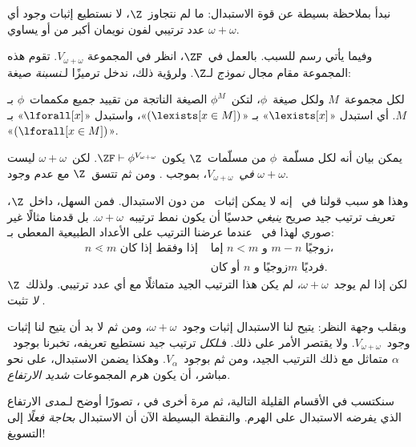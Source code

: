 \documentclass[../../../include/open-logic-section]{subfiles}
\begin{document}

نبدأ بملاحظة بسيطة عن قوة الاستبدال: ما لم نتجاوز~$\Z$، لا نستطيع
إثبات وجود أي عدد ترتيبي لفون نويمان أكبر من أو يساوي
$\omega + \omega$.

وفيما يأتي رسم للسبب. بالعمل في~$\ZF$، انظر في المجموعة
$V_{\omega+\omega}$. تقوم هذه المجموعة مقام مجال \emph{نموذج} لـ$\Z$.
ولرؤية ذلك، ندخل ترميزًا لـ\emph{نسبنة} صيغة:
\begin{defn}
	لكل مجموعة~$M$ ولكل صيغة~$\phi$، لتكن~$\phi^M$ الصيغة الناتجة من
	تقييد جميع مكممات~$\phi$ بـ$M$. أي استبدل «$\lexists[x]$» بـ
	«$(\lexists[x \in M])$»، واستبدل «$\lforall[x]$» بـ
	«$(\lforall[x \in M])$».
\end{defn}\noindent
يمكن بيان أنه لكل مسلّمة~$\phi$ من مسلّمات~$\Z$ يكون
$\ZF \vdash \phi^{V_{\omega+\omega}}$. لكن~$\omega+\omega$ ليست
\emph{في}~$V_{\omega+\omega}$، بموجب
. ومن ثم تتسق~$\Z$ مع عدم وجود
$\omega+\omega$.

وهذا هو سبب قولنا في~ إنه لا يمكن
إثبات~ من دون
الاستبدال. فمن السهل، داخل~$\Z$، تعريف ترتيب جيد صريح \emph{ينبغي}
حدسيًا أن يكون نمط ترتيبه~$\omega+\omega$. بل قدمنا مثالًا غير صوري
لهذا في~ عندما عرضنا الترتيب على الأعداد
الطبيعية المعطى بـ:
\begin{align*}
	n \lessdot m \text{ إذا وفقط إذا كان }&
	\text{إما }n < m\text{ و }m-n\text{ زوجيًا،}\\
	& \text{أو كان $n$ زوجيًا و$m$ فرديًا.}
\end{align*}
لكن إذا لم يوجد~$\omega+\omega$، لم يكن هذا الترتيب الجيد متماثلًا مع
أي عدد ترتيبي. ولذلك~$\Z$ \emph{لا} تثبت
.

وبقلب وجهة النظر: يتيح لنا الاستبدال إثبات وجود~$\omega+\omega$،
ومن ثم لا بد أن يتيح لنا إثبات وجود~$V_{\omega+\omega}$. ولا يقتصر
الأمر على ذلك. فـ\emph{لكل} ترتيب جيد نستطيع تعريفه، تخبرنا
 بوجود~$\alpha$
متماثل مع ذلك الترتيب الجيد، ومن ثم بوجود~$V_\alpha$. وهكذا يضمن
الاستبدال، على نحو مباشر، أن يكون هرم المجموعات \emph{شديد الارتفاع}.

سنكتسب في الأقسام القليلة التالية، ثم مرة أخرى في
، تصورًا أوضح لـ\emph{مدى} الارتفاع
الذي يفرضه الاستبدال على الهرم. والنقطة البسيطة الآن أن الاستبدال
\emph{بحاجة فعلًا} إلى التسويغ!
\end{document}

